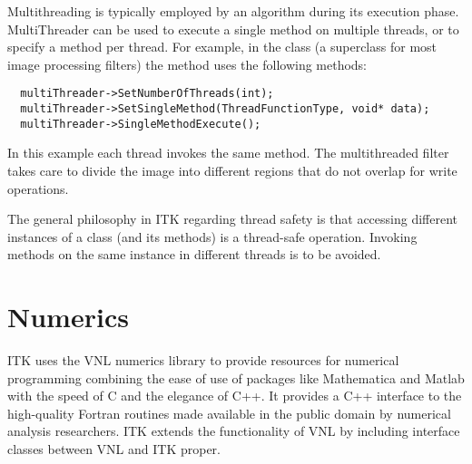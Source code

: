 Multithreading is typically employed by an algorithm during its execution
phase. MultiThreader can be used to execute a single method on
multiple threads, or to specify a method per thread. For example, in the 
class  (a superclass for most image processing filters)
the  method uses the following methods:

\small
\begin{verbatim}
  multiThreader->SetNumberOfThreads(int);
  multiThreader->SetSingleMethod(ThreadFunctionType, void* data);
  multiThreader->SingleMethodExecute();
\end{verbatim}
\normalsize

In this example each thread invokes the same method. The multithreaded filter
takes care to divide the image into different regions that do not overlap for
write operations.

The general philosophy in ITK regarding thread safety is that accessing
different instances of a class (and its methods) is a thread-safe operation.
Invoking methods on the same instance in different threads is to be avoided.


\section{Numerics}
\label{sec:Numerics}


ITK uses the VNL numerics library to provide resources for numerical
programming combining the ease of use of packages like Mathematica and Matlab
with the speed of C and the elegance of C++. It provides a C++ interface to
the high-quality Fortran routines made available in the public domain by
numerical analysis researchers. ITK extends the functionality of VNL
by including interface classes between VNL and ITK proper.

